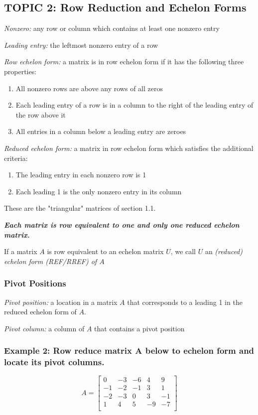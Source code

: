\documentclass[12pt]{article} %
\begin{document}
\pagebreak
\subsection{TOPIC 2: Row Reduction and Echelon Forms}
\emph{Nonzero:} any row or column which contains at least one nonzero entry

\emph{Leading entry:} the leftmost nonzero entry of a row

\emph{Row echelon form:} a matrix is in row echelon form if it has the following three properties:
\begin{enumerate}
	\item All nonzero rows are above any rows of all zeros
	\item Each leading entry of a row is in a column to the right of the leading entry of the row above it
	\item All entries in a column below a leading entry are zeroes
\end{enumerate}
\emph{Reduced echelon form:} a matrix in row echelon form which satisfies the additional criteria:
\begin{enumerate}
\addtocounter{enumi}{3}
\item The leading entry in each nonzero row is 1
\item Each leading 1 is the only nonzero entry in its column
\end{enumerate}
These are the "triangular" matrices of section 1.1.

\textbf{\emph{Each matrix is row equivalent to one and only one reduced echelon matrix.}}

If a matrix $A$ is row equivalent to an echelon matrix $U$, we call $U$ an \emph{(reduced) echelon form (REF/RREF) of $A$}

\subsubsection{Pivot Positions}
\emph{Pivot position:} a location in a matrix $A$ that corresponds to a leading 1 in the reduced echelon form of $A$.

\emph{Pivot column:} a column of $A$ that contains a pivot position
\subsubsection{Example 2: Row reduce matrix A below to echelon form and locate its pivot columns.}
$$A = \begin{bmatrix}
	0 & -3 & -6 & 4 & 9\\
	-1 & -2 & -1 & 3 & 1\\
	-2 & -3 & 0 & 3 & -1\\
	1 & 4 & 5 & -9 & -7\\
\end{bmatrix}$$
\end{document}
